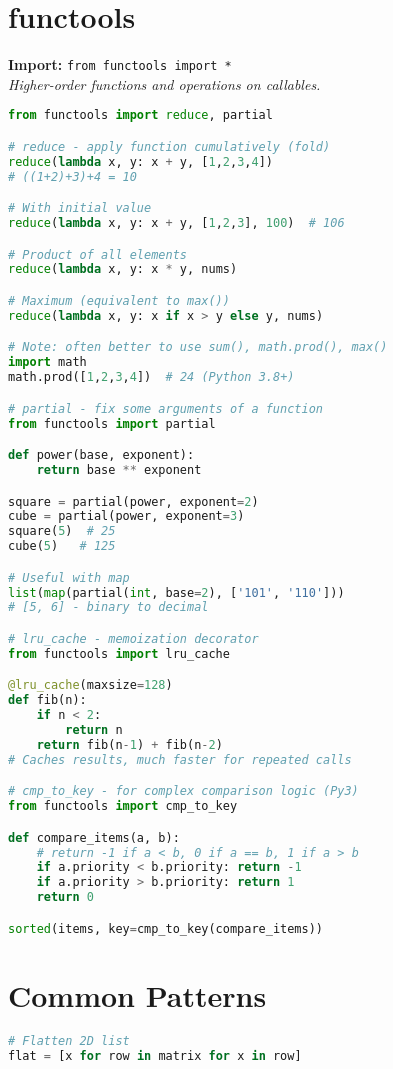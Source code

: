 \documentclass[8pt,landscape]{article}
\begin{document}
\begin{multicols}{3}
\section*{functools}
\textbf{Import:} \lstinline|from functools import *| \\
\textit{Higher-order functions and operations on callables.}

\begin{lstlisting}[language=Python]
from functools import reduce, partial

# reduce - apply function cumulatively (fold)
reduce(lambda x, y: x + y, [1,2,3,4])
# ((1+2)+3)+4 = 10

# With initial value
reduce(lambda x, y: x + y, [1,2,3], 100)  # 106

# Product of all elements
reduce(lambda x, y: x * y, nums)

# Maximum (equivalent to max())
reduce(lambda x, y: x if x > y else y, nums)

# Note: often better to use sum(), math.prod(), max()
import math
math.prod([1,2,3,4])  # 24 (Python 3.8+)

# partial - fix some arguments of a function
from functools import partial

def power(base, exponent):
    return base ** exponent

square = partial(power, exponent=2)
cube = partial(power, exponent=3)
square(5)  # 25
cube(5)   # 125

# Useful with map
list(map(partial(int, base=2), ['101', '110']))
# [5, 6] - binary to decimal

# lru_cache - memoization decorator
from functools import lru_cache

@lru_cache(maxsize=128)
def fib(n):
    if n < 2:
        return n
    return fib(n-1) + fib(n-2)
# Caches results, much faster for repeated calls

# cmp_to_key - for complex comparison logic (Py3)
from functools import cmp_to_key

def compare_items(a, b):
    # return -1 if a < b, 0 if a == b, 1 if a > b
    if a.priority < b.priority: return -1
    if a.priority > b.priority: return 1
    return 0

sorted(items, key=cmp_to_key(compare_items))
\end{lstlisting}

\section*{Common Patterns}
\begin{lstlisting}[language=Python]
# Flatten 2D list
flat = [x for row in matrix for x in row]


\end{lstlisting}
\end{multicols}
\end{document}
